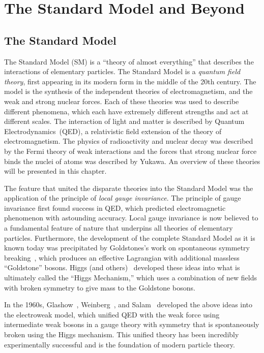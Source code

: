 \ifx\master\undefined\fi

\chapter{The Standard Model and Beyond}
\label{ch:theory}

\section{The Standard Model}
%
The Standard Model (SM) is a ``theory of almost everything'' that describes the
interactions of elementary particles.  The Standard Model is a \emph{quantum
field theory}, first appearing in its modern form in the middle of the 20th
century.  The model is the synthesis of the independent theories of
electromagnetism, and the weak and strong nuclear forces.  Each of these
theories was used to describe different phenomena, which each have extremely
different strengths and act at different scales.  The interaction of light and
matter is described by Quantum Electrodynamics~(QED), a relativistic field
extension of the theory of electromagnetism.  The physics of radioactivity and
nuclear decay was described by the Fermi theory of weak interactions and the
forces that strong nuclear force binds the nuclei of atoms was described by
Yukawa.  An overview of these theories will be presented in this chapter.  

The feature that united the disparate theories into the Standard Model was the
application of the principle of \emph{local gauge invariance}. The principle of
gauge invariance first found success in QED, which predicted electromagnetic
phenomenon with astounding accuracy.  Local gauge invariance is now believed to
a fundamental feature of nature that underpins all theories of elementary
particles.  Furthermore, the development of the complete Standard Model as it is
known today was precipitated by Goldstones's work on spontaneous symmetry
breaking~\cite{Goldstone:1961eq,PhysRev.127.965}, which produces an effective
Lagrangian with additional massless ``Goldstone'' bosons.  Higgs (and
others)~\cite{PhysRevLett.13.321, PhysRevLett.13.508,PhysRevLett.13.585}
developed these ideas into what is ultimately called the ``Higgs Mechanism,''
which uses a combination of new fields with broken symmetry to give mass to the
Goldstone bosons.

In the 1960s, Glashow~\cite{Glashow:1961tr}, Weinberg~\cite{Weinberg:1967tq}, 
and Salam~\cite{Salam:1968rm} developed the above ideas into the
electroweak model, which unified QED with the weak force using intermediate weak
bosons in a gauge theory with symmetry that is spontaneously broken using the Higgs
mechanism.  This unified theory has been incredibly experimentally successful
and is the foundation of modern particle theory.

